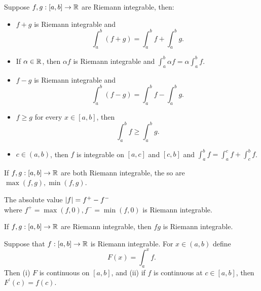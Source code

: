 \documentclass[twoside]{article}
\begin{document}
\begin{theorem}
	Suppose $f, g : [a, b] \to \mathbb{R}$ are Riemann integrable, then:
	\begin{itemize}
		\item $f + g$ is Riemann integrable and
		      \begin{equation*}
			      \int_{a}^{b} (f + g) = \int_{a}^{b} f + \int_{a}^{b} g.
		      \end{equation*}
		\item If $\alpha \in \mathbb{R}$, then $\alpha f$ is Riemann integrable and
		      $\int_{a}^{b} \alpha f = \alpha \int_{a}^{b} f$.
		\item $f - g$ is Riemann integrable and
		      \begin{equation*}
			      \int_{a}^{b} (f - g) = \int_{a}^{b} f - \int_{a}^{b} g.
		      \end{equation*}
		\item $f \geq g$ for every $x \in [a, b]$, then
		      \begin{equation*}
			      \int_{a}^{b} f \geq \int_{a}^{b} g.
		      \end{equation*}
		\item $c \in (a, b)$, then $f$ is integrable on $[a, c]$ and $[c, b]$ and
		      $\int_{a}^{b} f = \int_{a}^{c} f + \int_{c}^{b} f$.
	\end{itemize}
\end{theorem}

\begin{theorem}
	If $f, g : [a, b] \to \mathbb{R}$ are both Riemann integrable, the so are $\max(f, g), \min(f, g)$.
\end{theorem}

\begin{corollary}
	The absolute value $\abs{f} = f^{+} - f^{-}$\\
	where $f^{+} = \max(f, 0), f^{-} = \min(f, 0)$ is Riemann integrable.
\end{corollary}

\begin{theorem}
    If $f, g : [a, b] \to \mathbb{R}$ are Riemann integrable, then $fg$ is Riemann integrable.
\end{theorem}

\begin{theorem}
    Suppose that $f : [a, b] \to \mathbb{R}$ is Riemann integrable. For $x \in (a,b)$ define 
    \begin{equation*}
        F(x) = \int_{a}^{x} f.
    \end{equation*}
    Then (i) $F$ is continuous on $[a,b]$, and (ii) if $f$ is continuous at $c \in [a,b]$,
    then $F^{\prime}(c) = f(c)$.
\end{theorem}
\end{document}
